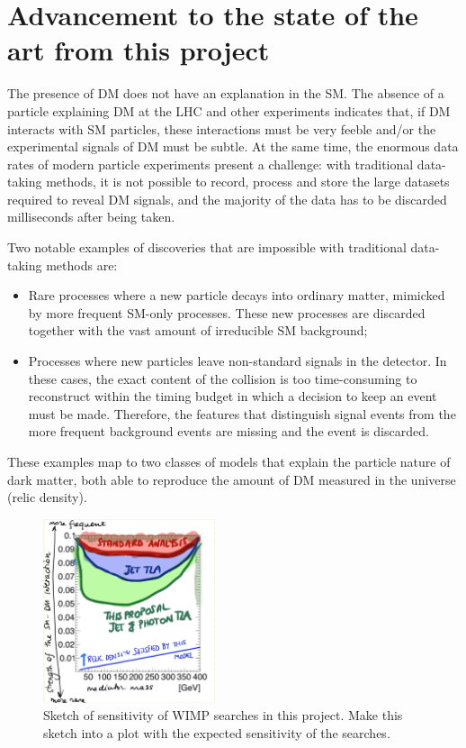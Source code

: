 \documentclass[11pt,a4paper]{article}
\begin{document}
\section{Advancement to the state of the art from this project} 
\smallskip

The presence of DM does not have an explanation in the SM. 
The absence of a particle explaining DM at the LHC and other experiments indicates that, if DM interacts with SM particles, these interactions must be very feeble and/or the experimental signals of DM must be subtle. 
At the same time, the enormous data rates of modern particle experiments present a challenge: with traditional data-taking methods, it is not possible to record, process and store the large datasets required to reveal DM signals, and the majority of the data has to be discarded milliseconds after being taken. 
  
Two notable examples of discoveries that are impossible with traditional data-taking methods are:
\begin{itemize} 
\item Rare processes where a new particle decays into ordinary matter, mimicked by more frequent SM-only processes.
These new processes are discarded together with the vast amount of irreducible SM background;%
\item Processes where new particles leave non-standard signals in the detector. 
In these cases, the exact content of the collision is too time-consuming to reconstruct within the timing budget in which a decision to keep an event must be made. Therefore, the features that distinguish signal events from the more frequent background events are missing and the event is discarded.
\end{itemize}

These examples map to two classes of models that explain the particle nature of dark matter, both able to reproduce the amount of DM measured in the universe (relic density). 

\begin{figure} 
\begin{center}
\includegraphics[width=0.45\textwidth]{figs/SensitivityWIMP.png}
\caption{Sketch of sensitivity of WIMP searches in this project. \scriptsize \color{red} Make this sketch into a plot with the expected sensitivity of the searches. \color{black}\label{fig:pastFutureConstraints} }
\end{center}
\end{figure}
\end{document}
